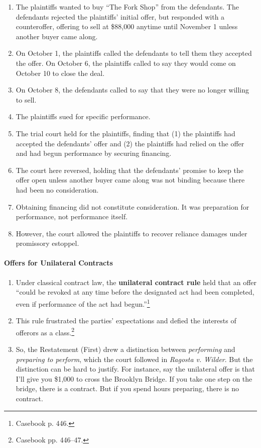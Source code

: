 \begin{enumerate}
    \item The plaintiffs wanted to buy ``The Fork Shop'' from the defendants. 
    The defendants rejected the plaintiffs' initial offer, but responded with 
    a counteroffer, offering to sell at \$88,000 anytime until November 1 
    unless another buyer came along.
    \item On October 1, the plaintiffs called the defendants to tell them they 
    accepted the offer. On October 6, the plaintiffs called to say they would 
    come on October 10 to close the deal.
    \item On October 8, the defendants called to say that they were no longer 
    willing to sell.
    \item The plaintiffs sued for specific performance.
    \item The trial court held for the plaintiffs, finding that (1) the 
    plaintiffs had accepted the defendants' offer and (2) the plaintiffs had 
    relied on the offer and had begun performance by securing financing.
    \item The court here reversed, holding that the defendants' promise to 
    keep the offer open unless another buyer came along was not binding 
    because there had been no consideration.
    \item Obtaining financing did not constitute consideration. It was 
    preparation for performance, not performance itself.
    \item However, the court allowed the plaintiffs to recover reliance 
    damages under promissory estoppel.
\end{enumerate}

\paragraph{Offers for Unilateral Contracts}

\begin{enumerate}
    \item Under classical contract law, the \textbf{unilateral contract rule} 
    held that an offer ``could be revoked at any time before the designated 
    act had been completed, even if performance of the act had 
    begun.''\footnote{Casebook p. 446.}
    \item This rule frustrated the parties' expectations and defied the 
    interests of offerors as a class.\footnote{Casebook pp. 446--47.}
    \item So, the Restatement (First) drew a distinction between 
    \emph{performing} and \emph{preparing to perform}, which the court 
    followed in \emph{Ragosta v. Wilder}. But the distinction can be hard to 
    justify. For instance, say the unilateral offer is that I'll give you 
    \$1,000 to cross the Brooklyn Bridge. If you take one step on the bridge, 
    there is a contract. But if you spend hours preparing, there is no 
    contract.
\end{enumerate}

